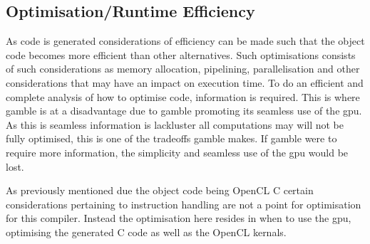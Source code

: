 \subsection*{Optimisation/Runtime Efficiency}
As code is generated considerations of efficiency can be made such that the object code becomes more efficient than other alternatives.
Such optimisations consists of such considerations as memory allocation, pipelining, parallelisation and other considerations that may have an impact on execution time.
To do an efficient and complete analysis of how to optimise code, information is required.
This is where \gls{gamble} is at a disadvantage due to \gls{gamble} promoting its seamless use of the \acrshort{gpu}.
As this is seamless information is lackluster all computations may will not be fully optimised, this is one of the tradeoffs \gls{gamble} makes.
If \gls{gamble} were to require more information, the simplicity and seamless use of the \acrshort{gpu} would be lost.

As previously mentioned due the object code being OpenCL C certain considerations pertaining to instruction handling are not a point for optimisation for this compiler.
Instead the optimisation here resides in when to use the \acrshort{gpu}, optimising the generated C code as well as the OpenCL kernals.




